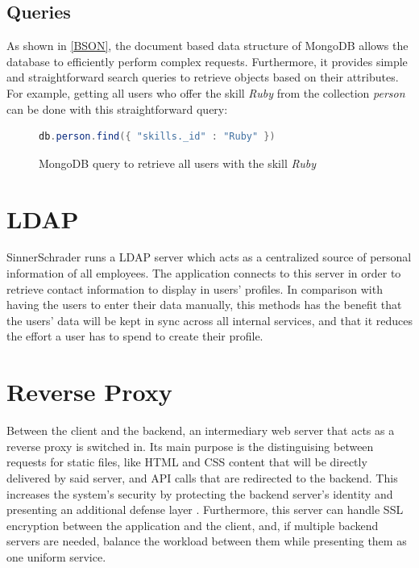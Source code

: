 \newpage



\subsection{Queries}
As shown in \ref{BSON}, the document based data structure of MongoDB allows the database to efficiently perform complex requests. Furthermore, it provides simple and straightforward search queries to retrieve objects based on their attributes. For example, getting all users who offer the skill \textit{Ruby} from the collection \textit{person} can be done with this straightforward query:
\begin{figure}[h]
\begin{lstlisting}[language=Java]
db.person.find({ "skills._id" : "Ruby" })
\end{lstlisting}
\caption[Example Database Query]{MongoDB query to retrieve all users with the skill \textit{Ruby}}
\end{figure}

\section{LDAP}
SinnerSchrader runs a LDAP server which acts as a centralized source of personal information of all employees. The application connects to this server in order to retrieve contact information to display in users' profiles. In comparison with having the users to enter their data manually, this methods has the benefit that the users' data will be kept in sync across all internal services, and that it reduces the effort a user has to spend to create their profile.

\section{Reverse Proxy}
Between the client and the backend, an intermediary web server that acts as a reverse proxy is switched in. Its main purpose is the distinguising between requests for static files, like HTML and CSS content that will be directly delivered by said server, and API calls that are redirected to the backend. This increases the system's security by protecting the backend server's identity and presenting an additional defense layer \cite{NGINX}. Furthermore, this server can handle SSL encryption between the application and the client, and, if multiple backend servers are needed, balance the workload between them while presenting them as one uniform service.

